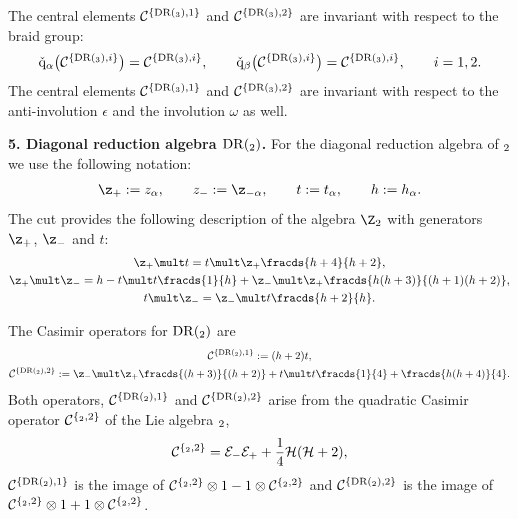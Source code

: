 \documentclass[pdftex]{sigma}
\def\a{\alpha}\def\Ar{{\rm A}}\def\Ab{\bar{\rm A}}\def\b{\beta}\def\bb{\mathfrak{b}}
\def\q{\check{\mathrm q}}\def\Q{\mathrm{Q}}\def\r#1{(\ref{#1})}\let\rf=\r
\numberwithin{equation}{section}
\begin{document}
The central elements ${\mathcal{C}}^{\{ {\mathrm{DR}}(\sl_3),1\} }$ and ${\mathcal{C}}^{\{ {\mathrm{DR}}(\sl_3),2\} }$ are invariant with respect to the braid group:
\begin{gather*}
 \q_\a \bigl({\mathcal{C}}^{\{ {\mathrm{DR}}(\sl_3),i\} }\bigr)={\mathcal{C}}^{\{ {\mathrm{DR}}(\sl_3),i\} }  ,
\qquad \q_\b \bigl({\mathcal{C}}^{\{ {\mathrm{DR}}(\sl_3),i\} }\bigr)={\mathcal{C}}^{\{ {\mathrm{DR}}(\sl_3),i\} }  ,\qquad i=1,2 .
\end{gather*}
The  central elements ${\mathcal{C}}^{\{ {\mathrm{DR}}(\sl_3),1\} }$ and ${\mathcal{C}}^{\{ {\mathrm{DR}}(\sl_3),2\} }$ are invariant with respect to the anti-involution
$\epsilon$ and the involution $\omega$ as well.

{\bf 5. Diagonal reduction algebra ${\mathrm{DR}}(\sl_2)$.}
For the diagonal reduction algebra of $\sl_2$ we use the following notation:
\begin{gather*}
\z_+:=z_\a ,\qquad z_-:=\z_{-\a} ,\qquad t:=t_\a ,\qquad h:=h_\a.
\end{gather*}
The cut provides the following description of the algebra $\Z_2$ with generators $\z_+ $, $\z_{-}$ and $t$:
\begin{gather}  \z_+\mult t  =t\mult \z_+ \fracds{h +4}{h +2}  ,\label{rsl2pe}\\
\z_+\mult \z_{-} =h -t\mult t  \fracds{1}{h}+\z_{-}\mult\z_+  \fracds{h (h +3)}{(h +1)(h +2)} ,\label{rsl2pm}\\
 t\mult \z_{-}  =\z_{-}\mult t   \fracds{h+2}{h}  .\label{rsl2po}
 \end{gather}

The Casimir operators for ${\mathrm{DR}}(\sl_2)$ are
\begin{gather}\label{cas-sl21}
{\mathcal{C}}^{\{ {\mathrm{DR}}(\sl_2),1\} } :=(h+2)t ,\\
\label{cas-sl22}  {\mathcal{C}}^{\{ {\mathrm{DR}}(\sl_2),2\} }:=\z_-\mult\z_+ \fracds{(h+3)}{(h+2)}+t\mult t  \fracds{1}{4}+\fracds{h(h+4)}{4}.
\end{gather}
Both operators, ${\mathcal{C}}^{\{ {\mathrm{DR}}(\sl_2),1\} }$ and ${\mathcal{C}}^{\{ {\mathrm{DR}}(\sl_2),2\} }$ arise from the quadratic Casimir operator
${\mathcal{C}}^{\{\sl_2,2\} }$ of the Lie algebra $\sl_2$,
\[
{\mathcal{C}}^{\{\sl_2,2\} }={\mathcal{E}}_{-}{\mathcal{E}}_+ +\frac{1}{4}{\mathcal{H}}({\mathcal{H}}+2)  ,
\]
${\mathcal{C}}^{\{ {\mathrm{DR}}(\sl_2),1\} }$ is the image of ${\mathcal{C}}^{\{ \sl_2,2\} }\otimes 1-1\otimes {\mathcal{C}}^{\{ \sl_2,2\} }$ and
${\mathcal{C}}^{\{ {\mathrm{DR}}(\sl_2),2\} }$ is the image of ${\mathcal{C}}^{\{ \sl_2,2\} }\otimes 1+1\otimes {\mathcal{C}}^{\{ \sl_2,2\} }$.
\end{document}

